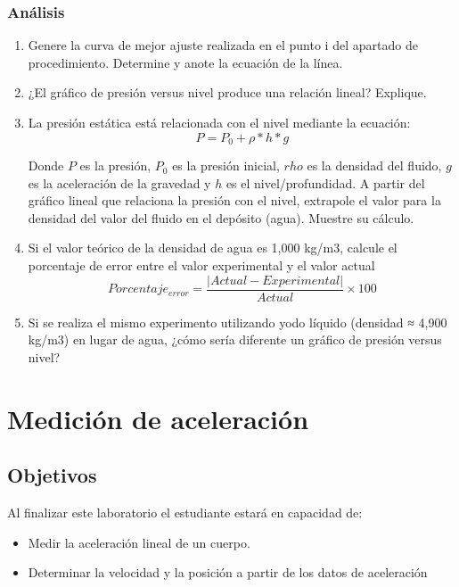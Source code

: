 \documentclass[12pt,letterpaper]{report}
\newcommand{\obj}{Objetivos}
\newcommand{\capacidad}{Al finalizar este laboratorio el estudiante estará en capacidad de:}
\begin{document}
\subsection{Análisis}
\begin{enumerate}
    \item Genere la curva de mejor ajuste realizada en el punto i del apartado de procedimiento. Determine y anote la ecuación de la línea.
    \item ¿El gráfico de presión versus nivel produce una relación lineal? Explique. 
    \item La presión estática está relacionada con el nivel mediante la ecuación:
    \begin{equation}
        P=P_0+\rho * h * g
    \end{equation}
    
    Donde $P$ es la presión, $P_0$ es la presión inicial, $rho$ es la densidad del fluido, $g$ es la aceleración de la gravedad y $h$ es el nivel/profundidad. A partir del gráfico lineal que relaciona la presión con el nivel, extrapole el valor para la densidad del valor del fluido en el depósito (agua). Muestre su cálculo.
    \item Si el valor teórico de la densidad de agua es 1,000 kg/m3, calcule el porcentaje de error entre el valor experimental y el valor actual
    \begin{equation}
        Porcentaje_{error}=\frac{|Actual-Experimental|}{Actual}\times 100
    \end{equation}
    \item Si se realiza el mismo experimento utilizando yodo líquido (densidad ≈ 4,900 kg/m3) en lugar de agua, ¿cómo sería diferente un gráfico de presión versus nivel?
\end{enumerate}



\chapter{Medición de aceleración}
\section{\obj}
\capacidad
\begin{itemize}
\item Medir la aceleración lineal de un cuerpo.
\item Determinar la velocidad y la posición a partir de los datos de aceleración
\end{itemize}
\end{document}
